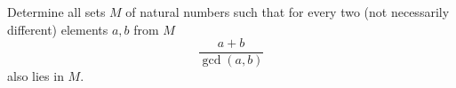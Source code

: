 Determine all sets $M$ of natural numbers such that for every two (not necessarily different)
elements $a,b$ from $M$
$$\frac{a+b}{\gcd(a,b)}$$
also lies in $M$.